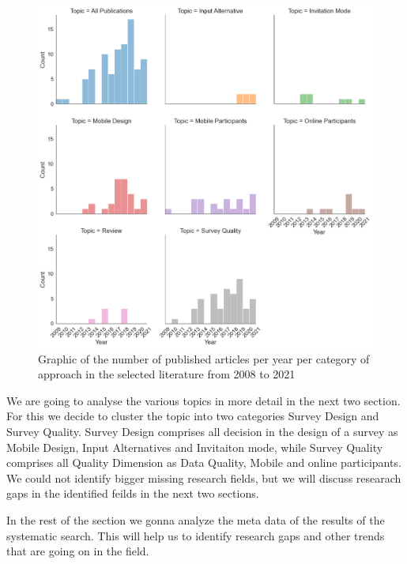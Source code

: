 \begin{figure}
    \centering
    \includegraphics[width=\textwidth]{reports/figures/publications_per_year_per_categories.png}
     \caption{Graphic of the number of published articles per year per category of approach in the selected literature from 2008 to 2021}
    \label{fig: publications_per_year_per_categories}
\end{figure}

We are going to analyse the various topics in more detail in the next two section. For this we decide to cluster the topic into two categories Survey Design and Survey Quality. Survey Design comprises all decision in the design of a survey as Mobile Design, Input Alternatives and Invitaiton mode, while Survey Quality comprises all Quality Dimension as Data Quality, Mobile and online participants. We could not identify bigger missing research fields, but we will discuss researach gaps in the identified feilds in the next two sections.  

In the rest of the section we gonna analyze the meta data of the results of the systematic search. This will help us to identify research gaps and other trends that are going on in the field. 

